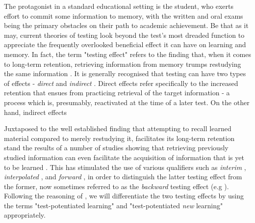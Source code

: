 \documentclass[../main.tex]{subfiles}
\begin{document}
The protagonist in a standard educational setting is the student, who exerts effort to commit some information to memory, with the written and oral exams being the primary obstacles on their path to academic achievement. Be that as it may, current theories of testing look beyond the test's most dreaded function to appreciate the frequently overlooked beneficial effect it can have on learning and memory. In fact, the term "testing effect" refers to the finding that, when it comes to long-term retention, retrieving information from memory trumps restudying the same information \citep{roedigeriiiPowerTestingMemory2006}. It is generally recognised that testing can have two types of effects - \textit{direct} and \textit{indirect} \cite{arnoldTestpotentiatedLearningDistinguishing2013, arnoldFreeRecallEnhances2013, roedigeriiiPowerTestingMemory2006}. Direct effects refer specifically to the increased retention that ensues from practicing retrieval of the target information - a process which is, presumably, reactivated at the time of a later test. On the other hand, indirect effects 

Juxtaposed to the well established finding that attempting to recall learned material compared to merely restudying it, facilitates its long-term retention \citep{roedigeriiiPowerTestingMemory2006, roedigeriiiTestEnhancedLearningTaking2006, rowlandEffectTestingRestudy2014, adesopeRethinkingUseTests2017, roedigeriiiCriticalRoleRetrieval2011, gloverTestingPhenomenonNot1989} stand the results of a number of studies showing that retrieving previously studied information can even facilitate the acquisition of information that is yet to be learned \citep{chanRetrievalPotentiatesNew2018, yangEnhancingLearningRetrieval2018}. This has stimulated the use of various qualifiers such as \textit{interim} \citep{wissmanInterimTestEffect2011}, \textit{interpolated} \citep{szpunarInterpolatedMemoryTests2013}, and \textit{forward} \citep{pastotterRetrievalPracticeEnhances2014,yangEnhancingLearningRetrieval2018}, in order to distinguish the latter testing effect from the former, now sometimes referred to as the \textit{backward} testing effect (e.g \citealp{yangEnhancingLearningRetrieval2018}). Following the reasoning of \cite{chanRetrievalPotentiatesNew2018}, we will differentiate the two testing effects by using the terms "test-potentiated learning" and "test-potentiated \textit{new} learning" appropriately.
\end{document}
